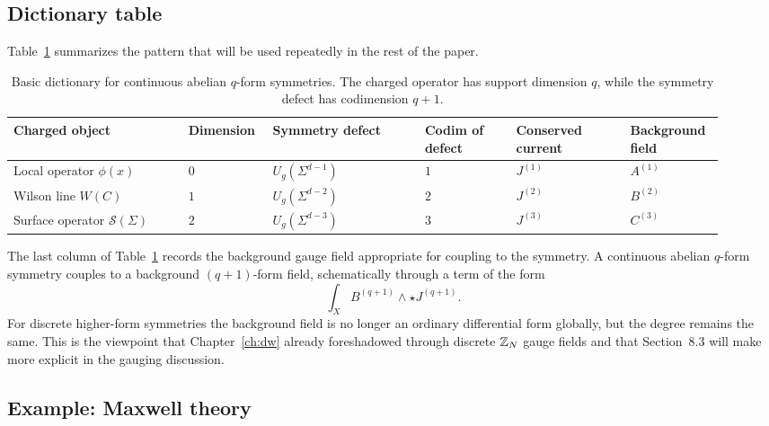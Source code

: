 \subsection{Dictionary table}

Table~\ref{tab:qform-dictionary} summarizes the pattern that will be used repeatedly in the rest of the paper.

\begin{table}[h]
    \centering
    \small
    \begin{tabular}{@{}p{0.23\linewidth}p{0.10\linewidth}p{0.20\linewidth}p{0.12\linewidth}p{0.15\linewidth}p{0.12\linewidth}@{}}
        \toprule
        Charged object & Dimension & Symmetry defect & Codim of defect & Conserved current & Background field \\
        \midrule
        Local operator $\phi(x)$ & $0$ & $U_g(\Sigma^{d-1})$ & $1$ & $J^{(1)}$ & $A^{(1)}$ \\
        Wilson line $W(C)$ & $1$ & $U_g(\Sigma^{d-2})$ & $2$ & $J^{(2)}$ & $B^{(2)}$ \\
        Surface operator $\mathcal S(\Sigma)$ & $2$ & $U_g(\Sigma^{d-3})$ & $3$ & $J^{(3)}$ & $C^{(3)}$ \\
        \bottomrule
    \end{tabular}
    \caption{Basic dictionary for continuous abelian $q$-form symmetries. The charged operator has support dimension $q$, while the symmetry defect has codimension $q+1$.}
    \label{tab:qform-dictionary}
\end{table}

\begin{remark}\label{rem:qform-background}
The last column of Table~\ref{tab:qform-dictionary} records the background gauge field appropriate for coupling to the symmetry. A continuous abelian $q$-form symmetry couples to a background $(q+1)$-form field, schematically through a term of the form
\begin{equation}\label{eq:qform-background-coupling}
\int_X B^{(q+1)}\wedge \star J^{(q+1)}.
\end{equation}
For discrete higher-form symmetries the background field is no longer an ordinary differential form globally, but the degree remains the same. This is the viewpoint that Chapter~\ref{ch:dw} already foreshadowed through discrete $\mathbb{Z}_N$ gauge fields and that Section~8.3 will make more explicit in the gauging discussion.
\end{remark}

\subsection{Example: Maxwell theory}


